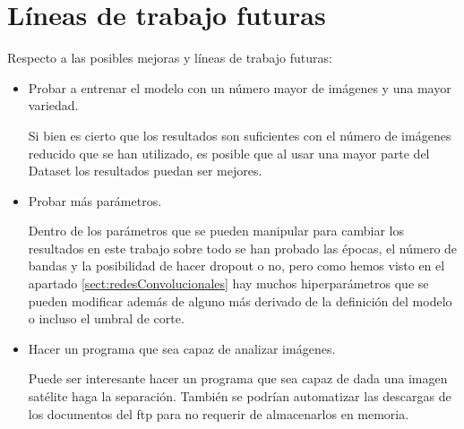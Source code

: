 \section{Líneas de trabajo futuras}\label{sect:lineasFuturas}
Respecto a las posibles mejoras y líneas de trabajo futuras:
\begin{itemize}
	\item Probar a entrenar el modelo con un número mayor de imágenes y una mayor variedad.
	
	Si bien es cierto que los resultados son suficientes con el número de imágenes reducido que se han utilizado, es posible que al usar una mayor parte del Dataset los resultados puedan ser mejores.
	
	\item Probar más parámetros.
	
	Dentro de los parámetros que se pueden manipular para cambiar los resultados en este trabajo sobre todo se han probado las épocas, el número de bandas y la posibilidad de hacer dropout o no, pero como hemos visto en el apartado \ref*{sect:redesConvolucionales} hay muchos hiperparámetros que se pueden modificar además de alguno más derivado de la definición del modelo o incluso el umbral de corte.

	\item Hacer un programa que sea capaz de analizar imágenes.
	
	Puede ser interesante hacer un programa que sea capaz de dada una imagen satélite haga la separación. También se podrían automatizar las descargas de los documentos del ftp para no requerir de almacenarlos en memoria.
		
\end{itemize}